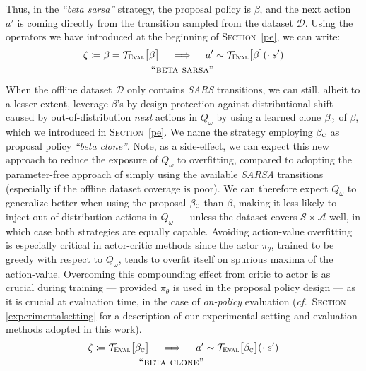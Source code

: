 Thus, in the \textit{``beta sarsa''} strategy,
the proposal policy is $\beta$, and
the next action $a'$ is coming directly from the transition sampled from the dataset $\mathcal{D}$.
Using the operators we have introduced at the beginning of \textsc{Section}~\ref{pe}, we can write:
\begin{align}
  \zeta \coloneqq \beta = \mathcal{T}_\textsc{Eval}\big[\beta\big]
  \quad \implies \quad
  a' &\sim \mathcal{T}_\textsc{Eval}\big[\beta\big](\cdot | s')
  \\ \tag*{\textsc{``beta sarsa''}}
  \label{betasarsa}
\end{align}
When the offline dataset $\mathcal{D}$ only contains \textit{SARS} transitions,
we can still, albeit to a lesser extent, leverage $\beta$'s by-design protection
against distributional shift caused by out-of-distribution \textit{next} actions in $Q_\omega$
by using a learned clone $\beta_\textsc{c}$ of $\beta$,
which we introduced in \textsc{Section}~\ref{pe}.
We name the strategy employing $\beta_\textsc{c}$ as proposal policy \textit{``beta clone''}.
Note, as a side-effect, we can expect this new approach to reduce the exposure of $Q_\omega$ to overfitting,
compared to adopting the parameter-free approach of simply using the available \textit{SARSA} transitions
(especially if the offline dataset coverage is poor).
We can therefore expect $Q_\omega$ to generalize better when using the proposal $\beta_\textsc{c}$ than $\beta$,
making it less likely to inject out-of-distribution actions in $Q_\omega$
--- unless the dataset covers $\mathcal{S} \times \mathcal{A}$ well,
in which case both strategies are equally capable.
Avoiding action-value overfitting is especially critical in actor-critic methods
since the actor $\pi_\theta$, trained to be greedy with respect to $Q_\omega$, tends to overfit itself
on spurious maxima of the action-value.
Overcoming this compounding effect from critic to actor is as crucial during training
--- provided $\pi_\theta$ is used in the proposal policy design ---
as it is crucial at evaluation time, in the case of \emph{on-policy} evaluation
(\textit{cf.}~\textsc{Section} \ref{experimentalsetting} for a description of our experimental setting
and evaluation methods adopted in this work).
\begin{align}
  \zeta \coloneqq \mathcal{T}_\textsc{Eval}\big[\beta_\textsc{c}\big]
  \quad \implies \quad
  a' &\sim \mathcal{T}_\textsc{Eval}\big[\beta_\textsc{c}\big](\cdot | s')
  \\ \tag*{\textsc{``beta clone''}}
  \label{betaclone}
\end{align}
